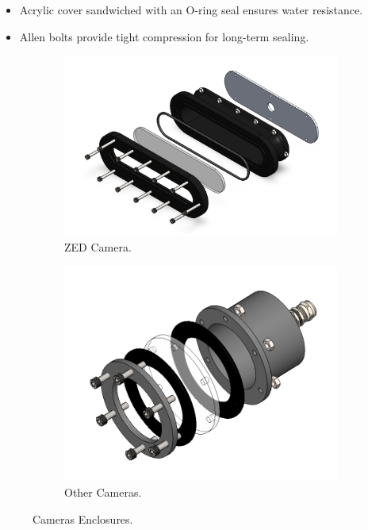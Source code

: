 \vspace{-0.7\baselineskip}
\begin{itemize}
    \setlength{\itemsep}{0pt}
    \item Acrylic cover sandwiched with an O-ring seal ensures water resistance.
    \item Allen bolts provide tight compression for long-term sealing.
\end{itemize}

\begin{figure}[h]
    \centering
    \begin{subfigure}[b]{0.45\columnwidth}
        \includegraphics[width=\textwidth]{Sections/2Design Rationale/images/ZED.png}
        \caption{ZED Camera.}
        \label{fig:zed_camera_enclosure}
    \end{subfigure}
    \hfill
    \begin{subfigure}[b]{0.5\columnwidth}
        \includegraphics[width=\textwidth]{Sections/2Design Rationale/images/Cameras.png}
        \caption{Other Cameras.}
        \label{fig:other_cameras_enclosure}
    \end{subfigure}
    \caption{Cameras Enclosures.}
    \label{fig:cameras_enclosures}
\end{figure}

